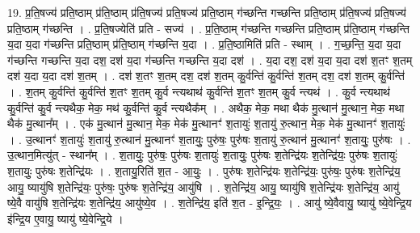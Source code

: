 \documentclass[17pt]{extarticle}
\begin{document}
19. प्र॒ति॒षज्य॑ प्रति॒ष्ठाम् प्र॑ति॒ष्ठाम् प्र॑ति॒षज्य॑ प्रति॒षज्य॑ प्रति॒ष्ठाम् ग॑च्छन्ति गच्छन्ति प्रति॒ष्ठाम् प्र॑ति॒षज्य॑ प्रति॒षज्य॑ प्रति॒ष्ठाम् ग॑च्छन्ति । . प्र॒ति॒षज्येति॑ प्रति - सज्य॑ । . प्र॒ति॒ष्ठाम् ग॑च्छन्ति गच्छन्ति प्रति॒ष्ठाम् प्र॑ति॒ष्ठाम् ग॑च्छन्ति य॒दा य॒दा ग॑च्छन्ति प्रति॒ष्ठाम् प्र॑ति॒ष्ठाम् ग॑च्छन्ति य॒दा । . प्र॒ति॒ष्ठामिति॑ प्रति - स्थाम् । . ग॒च्छ॒न्ति॒ य॒दा य॒दा ग॑च्छन्ति गच्छन्ति य॒दा दश॒ दश॑ य॒दा ग॑च्छन्ति गच्छन्ति य॒दा दश॑ । . य॒दा दश॒ दश॑ य॒दा य॒दा दश॑ श॒तꣳ श॒तम् दश॑ य॒दा य॒दा दश॑ श॒तम् । . दश॑ श॒तꣳ श॒तम् दश॒ दश॑ श॒तम् कु॒र्वन्ति॑ कु॒र्वन्ति॑ श॒तम् दश॒ दश॑ श॒तम् कु॒र्वन्ति॑ । . श॒तम् कु॒र्वन्ति॑ कु॒र्वन्ति॑ श॒तꣳ श॒तम् कु॒र्व न्त्यथाथ॑ कु॒र्वन्ति॑ श॒तꣳ श॒तम् कु॒र्व न्त्यथ॑ । . कु॒र्व न्त्यथाथ॑ कु॒र्वन्ति॑ कु॒र्व न्त्यथैक॒ मेक॒ मथ॑ कु॒र्वन्ति॑ कु॒र्व न्त्यथैक᳚म् । . अथैक॒ मेक॒ मथा थैक॑ मु॒त्थान॑ मु॒त्थान॒ मेक॒ मथा थैक॑ मु॒त्थान᳚म् । . एक॑ मु॒त्थान॑ मु॒त्थान॒ मेक॒ मेक॑ मु॒त्थानꣳ॑ श॒तायुः॑ श॒तायु॑ रु॒त्थान॒ मेक॒ मेक॑ मु॒त्थानꣳ॑ श॒तायुः॑ । . उ॒त्थानꣳ॑ श॒तायुः॑ श॒तायु॑ रु॒त्थान॑ मु॒त्थानꣳ॑ श॒तायुः॒ पुरु॑षः॒ पुरु॑षः श॒तायु॑ रु॒त्थान॑ मु॒त्थानꣳ॑ श॒तायुः॒ पुरु॑षः । . उ॒त्थान॒मित्यु॑त् - स्थान᳚म् । . श॒तायुः॒ पुरु॑षः॒ पुरु॑षः श॒तायुः॑ श॒तायुः॒ पुरु॑षः श॒तेन्द्रि॑यः श॒तेन्द्रि॑यः॒ पुरु॑षः श॒तायुः॑ श॒तायुः॒ पुरु॑षः श॒तेन्द्रि॑यः । . श॒तायु॒रिति॑ श॒त - आ॒युः॒ । . पुरु॑षः श॒तेन्द्रि॑यः श॒तेन्द्रि॑यः॒ पुरु॑षः॒ पुरु॑षः श॒तेन्द्रि॑य॒ आयु॒ ष्यायु॑षि श॒तेन्द्रि॑यः॒ पुरु॑षः॒ पुरु॑षः श॒तेन्द्रि॑य॒ आयु॑षि । . श॒तेन्द्रि॑य॒ आयु॒ ष्यायु॑षि श॒तेन्द्रि॑यः श॒तेन्द्रि॑य॒ आयु॑ ष्ये॒वै वायु॑षि श॒तेन्द्रि॑यः श॒तेन्द्रि॑य॒ आयु॑ष्ये॒व । . श॒तेन्द्रि॑य॒ इति॑ श॒त - इ॒न्द्रि॒यः॒ । . आयु॑ ष्ये॒वैवायु॒ ष्यायु॑ ष्ये॒वेन्द्रि॒य इ॑न्द्रि॒य ए॒वायु॒ ष्यायु॑ ष्ये॒वेन्द्रि॒ये । \newline
\end{document}
